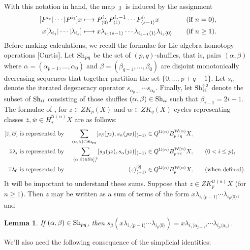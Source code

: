 \documentclass[11pt]{amsart}
\theoremstyle{plain}
\newtheorem{lem}[thm]{Lemma}
\theoremstyle{definition}
\newcommand{\calW}{\mathcal{W}}
\newcommand{\calU}{\mathcal{U}}
\theoremstyle{plain}
\newcommand{\restnwithsubscript}[2]{#1^{[2]}_{#2}}
\newcommand{\Shuffles}[2]{\textup{Sh}_{#1#2}}
\newcommand{\HalfShuffles}[2]{\textup{Sh}_{#1#2}^{\smash{\!\div2}}}
\begin{document}
\begin{Koszul complexes}
With this notation in hand, the map $\jmath$ is induced by the assignment
\begin{alignat*}{2}
[P^{i_s}|\cdots |P^{i_1}]x&\longmapsto P_{\langle 0\rangle}^{i_s}P_{\langle 1\rangle}^{i_s-1}\cdots P_{\langle s-1\rangle}^{i_1}x &\quad&(\textup{if }n=0),\\
x[\lambda_{i_1}|\cdots |\lambda_{i_s}]&\longmapsto x\lambda_{i_1\langle s-1\rangle}\cdots \lambda_{i_{s-1}\langle1\rangle}\lambda_{i_s\langle 0\rangle} &\quad&(\textup{if }n\geq1).%
\end{alignat*}
Before making calculations, we recall the formulae for Lie algebra homotopy operations [Curtis]. Let $\Shuffles{p}{q}$ be the set of $(p,q)$-shuffles, that is, pairs $(\alpha,\beta)$ where $\alpha=(\alpha_{p-1},\ldots,\alpha_0)$ and $\beta=(\beta_{q-1},\ldots,\beta_0)$ are disjoint monotonically decreasing sequences that together partition the set $\{0,\ldots,p+q-1\}$. Let $s_{\alpha}$ denote the iterated degeneracy operator $s_{\alpha_{p-1}}\cdots s_{\alpha_0}$.
Finally, let $\HalfShuffles{i}{i}$ denote the subset of $\Shuffles{i}{i}$ consisting of those shuffles $(\alpha,\beta)\in\Shuffles{i}{i}$ such that $\beta_{i-1}=2i-1$. The formulae of \cite[\S8]{CurtisSimplicialHtpy.pdf}, for $z\in ZK_p(X)$ and $w\in ZK_q(X)$ cycles representing classes $\overline{z},\overline{w}\in H_*^{\calU(n)}X$ are as follows:
\begin{alignat*}{3}
[\overline{z},\overline{w}]\textup{ is represented by }&&\sum_{(\alpha,\beta)\in\Shuffles{p}{q}}[s_\beta(\jmath z), s_\alpha(\jmath w)]_{\langle -1\rangle}&\in Q^{\calU(n)}B^{\calW(n)}_{p+q}X,\\
\overline{z}\lambda_i\textup{ is represented by }&&\sum_{(\alpha,\beta)\in\HalfShuffles{i}{i}}[s_\beta(\jmath z), s_\alpha(\jmath z)]_{\langle -1\rangle}&\in Q^{\calU(n)}B^{\calW(n)}_{p+i}X,&\quad&(0<i\leq p),\\
\overline{z}\lambda_0\textup{ is represented by }&&\restnwithsubscript{(z)}{\langle -1\rangle}&\in Q^{\calU(n)}B^{\calW(n)}_{p}X,&&(\textup{when defined}).
\end{alignat*}%
It will be important to understand these sums. Suppose that $z\in ZK_p^{\calU(n)}X$ (for $n\geq1$). Then  $z$ may be written as a sum of terms of the form $x\lambda_{i_1\langle p-1\rangle}\cdots \lambda_{i_p\langle 0\rangle}$, and
\begin{lem}\label{what degens do to iterated operations}
If $(\alpha,\beta)\in\Shuffles{p}{q}$, then $s_\beta(x\lambda_{i_1\langle p-1\rangle}\cdots \lambda_{i_p\langle 0\rangle})=x\lambda_{i_1\langle \alpha_{p-1}\rangle}\cdots \lambda_{i_p\langle \alpha_0\rangle}$.
\end{lem}
We'll also need the following consequence of the simplicial identities:


\end{Koszul complexes}
\end{document}
